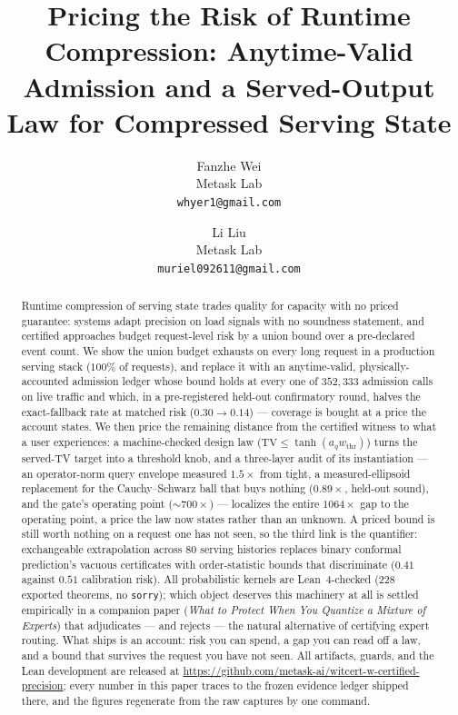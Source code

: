 \documentclass[11pt]{article}
\title{Pricing the Risk of Runtime Compression:
Anytime-Valid Admission and a Served-Output Law for
  Compressed Serving State}
\author{%
  Fanzhe Wei\\ Metask Lab\\ {\small\texttt{whyer1@gmail.com}}
  \and Li Liu\\ Metask Lab\\ {\small\texttt{muriel092611@gmail.com}}}
\date{}
\renewcommand{\_}{\WCorigunderscore\allowbreak}
\begin{document}
\maketitle

\begin{abstract}
Runtime compression of serving state trades quality for capacity with
no priced guarantee: systems adapt precision on load signals with no
soundness statement, and certified approaches budget request-level risk
by a union bound over a pre-declared event count. We show the union
budget exhausts on every long request in a production serving stack
($100\%$ of requests), and replace it with an anytime-valid,
physically-accounted admission ledger whose bound holds at every one of
$352{,}333$ admission calls on live traffic and which, in a
pre-registered held-out confirmatory round, halves the exact-fallback
rate at matched risk ($0.30\to0.14$) --- coverage is bought at a price
the account states. We then price the remaining distance from the
certified witness to what a user experiences: a machine-checked design
law ($\mathrm{TV}\le\tanh(a_q w_{\mathrm{thr}})$) turns the served-TV
target into a threshold knob, and a three-layer audit of its
instantiation --- an operator-norm query envelope measured $1.5\times$
from tight, a measured-ellipsoid replacement for the Cauchy--Schwarz
ball that buys nothing ($0.89\times$, held-out sound), and the gate's
operating point ($\sim\!700\times$) --- localizes the entire
$1064\times$ gap to the operating point, a price the law now states
rather than an unknown. A priced bound is still worth nothing on a
request one has not seen, so the third link is the quantifier:
exchangeable extrapolation across $80$ serving histories replaces
binary conformal prediction's vacuous certificates with order-statistic
bounds that discriminate ($0.41$ against $0.51$ calibration risk). All probabilistic kernels are Lean~4-checked ($228$
exported theorems, no \texttt{sorry}); which object deserves this
machinery at all is settled empirically in a companion paper
(\emph{What to Protect When You Quantize a Mixture of Experts}) that
adjudicates --- and rejects --- the natural alternative of certifying
expert routing. What ships is an account: risk you can spend, a gap you
can read off a law, and a bound that survives the request you have
not seen. All artifacts, guards, and the Lean development are released
at \url{https://github.com/metask-ai/witcert-w-certified-precision};
every number in this paper traces to the frozen evidence ledger shipped
there, and the figures regenerate from the raw captures by one command.
\end{abstract}
\end{document}
